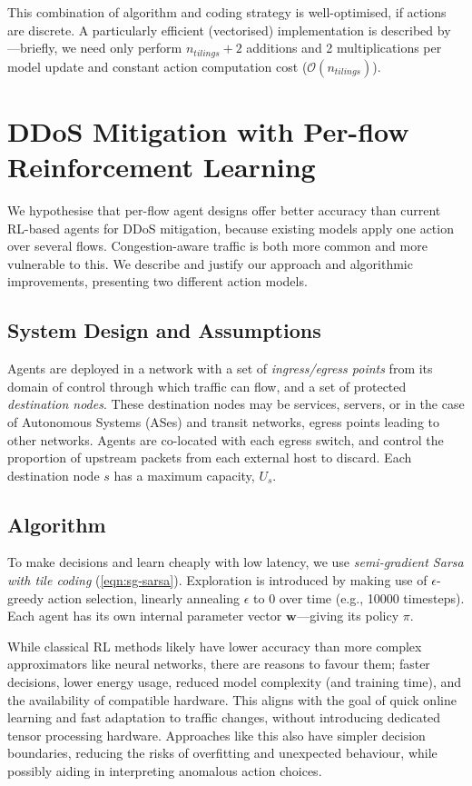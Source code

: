 \documentclass[10pt, times, conference, letterpaper]{IEEEtran}
\newcommand{\wvec}[1]{\ensuremath{\bm{w}_{#1}}}
\begin{document}
This combination of algorithm and coding strategy is well-optimised, if actions are discrete.
A particularly efficient (vectorised) implementation is described by \textcite{RL2E}---briefly, we need only perform $n_{\mathit{tilings}} + 2$ additions and \num{2} multiplications per model update and constant action computation cost ($\mathcal{O}(n_{\mathit{tilings}})$).

\section{DDoS Mitigation with Per-flow Reinforcement Learning}\label{sec:ddos-mitigation-with-per-flow-reinforcement-learning}
We hypothesise that per-flow agent designs offer better accuracy than current RL-based agents for DDoS mitigation, because existing models apply one action over several flows.
Congestion-aware traffic is both more common and more vulnerable to this.
We describe and justify our approach and algorithmic improvements, presenting two different action models.

\subsection{System Design and Assumptions}
Agents are deployed in a network with a set of \emph{ingress/egress points} from its domain of control through which traffic can flow, and a set of protected \emph{destination nodes}.
These destination nodes may be services, servers, or in the case of Autonomous Systems (ASes) and transit networks, egress points leading to other networks.
Agents are co-located with each egress switch, and control the proportion of upstream packets from each external host to discard.
Each destination node $s$ has a maximum capacity, $U_s$.

\subsection{Algorithm}
To make decisions and learn cheaply with low latency, we use \emph{semi-gradient Sarsa with tile coding} (\cref{eqn:sg-sarsa}).
Exploration is introduced by making use of $\epsilon$-greedy action selection, linearly annealing $\epsilon$ to 0 over time (e.g., \num{10000} timesteps).
Each agent has its own internal parameter vector $\wvec{}$---giving its policy $\pi$.

While classical RL methods likely have lower accuracy than more complex approximators like neural networks, there are reasons to favour them; faster decisions, lower energy usage, reduced model complexity (and training time), and the availability of compatible hardware.
This aligns with the goal of quick online learning and fast adaptation to traffic changes, without introducing dedicated tensor processing hardware.
Approaches like this also have simpler decision boundaries, reducing the risks of overfitting and unexpected behaviour, while possibly aiding in interpreting anomalous action choices.
\end{document}
